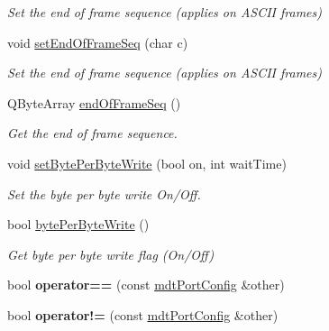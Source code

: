 \begin{DoxyCompactItemize}
\begin{DoxyCompactList}\small\item\em Set the end of frame sequence (applies on ASCII frames) \end{DoxyCompactList}\item 
void \hyperlink{classmdt_port_config_a9c67e95bb660a13313ec03e07a924793}{setEndOfFrameSeq} (char c)
\begin{DoxyCompactList}\small\item\em Set the end of frame sequence (applies on ASCII frames) \end{DoxyCompactList}\item 
QByteArray \hyperlink{classmdt_port_config_a42f87381e6d6892770917e4ca6c80072}{endOfFrameSeq} ()
\begin{DoxyCompactList}\small\item\em Get the end of frame sequence. \end{DoxyCompactList}\item 
void \hyperlink{classmdt_port_config_ac6cb3d8fbefad9a832335c3f2023832c}{setBytePerByteWrite} (bool on, int waitTime)
\begin{DoxyCompactList}\small\item\em Set the byte per byte write On/Off. \end{DoxyCompactList}\item 
bool \hyperlink{classmdt_port_config_a687dfdffd913cd68141a784f3f77bc7e}{bytePerByteWrite} ()
\begin{DoxyCompactList}\small\item\em Get byte per byte write flag (On/Off) \end{DoxyCompactList}\item 
\hypertarget{classmdt_port_config_a639c71f90cfeb7e2160ad90e9775054b}{
bool {\bfseries operator==} (const \hyperlink{classmdt_port_config}{mdtPortConfig} \&other)}
\label{classmdt_port_config_a639c71f90cfeb7e2160ad90e9775054b}

\item 
\hypertarget{classmdt_port_config_a5a539c86934d41306a3ed18a8292457d}{
bool {\bfseries operator!=} (const \hyperlink{classmdt_port_config}{mdtPortConfig} \&other)}
\label{classmdt_port_config_a5a539c86934d41306a3ed18a8292457d}

\end{DoxyCompactItemize}
